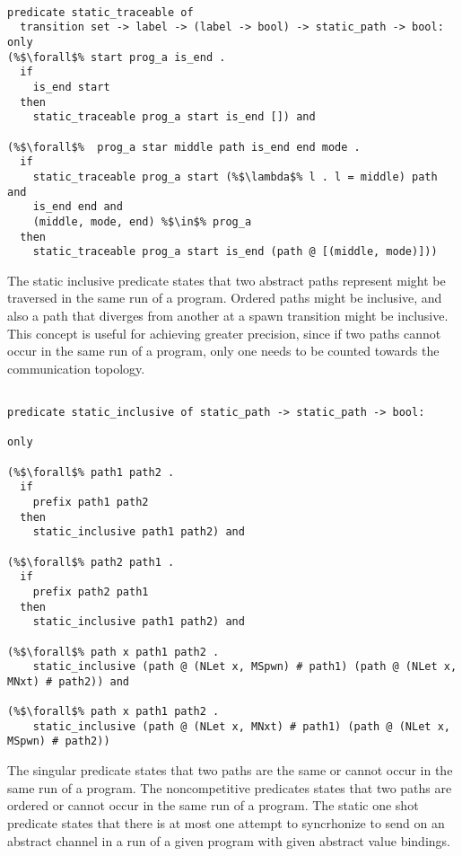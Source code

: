 \documentclass{article}
\begin{document}
\begin{lstlisting}[language=logic, style=codestyle1, escapechar=\%]

predicate static_traceable of
  transition set -> label -> (label -> bool) -> static_path -> bool:
only
(%$\forall$% start prog_a is_end .
  if
    is_end start
  then
    static_traceable prog_a start is_end []) and

(%$\forall$%  prog_a star middle path is_end end mode .
  if 
    static_traceable prog_a start (%$\lambda$% l . l = middle) path and
    is_end end and
    (middle, mode, end) %$\in$% prog_a 
  then
    static_traceable prog_a start is_end (path @ [(middle, mode)]))

\end{lstlisting}


The static inclusive predicate states that two abstract paths represent might be traversed in
the same run of a program. Ordered paths might be inclusive, and also a path that diverges
from another at a spawn transition might be inclusive.  This concept is useful for achieving
greater precision, since if two paths cannot occur in the same run of a program, only one needs
to be counted towards the communication topology. 


\begin{lstlisting}[language=logic, style=codestyle1, escapechar=\%]

predicate static_inclusive of static_path -> static_path -> bool:

only

(%$\forall$% path1 path2 .
  if
    prefix path1 path2
  then
    static_inclusive path1 path2) and

(%$\forall$% path2 path1 .
  if
    prefix path2 path1
  then
    static_inclusive path1 path2) and

(%$\forall$% path x path1 path2 .
    static_inclusive (path @ (NLet x, MSpwn) # path1) (path @ (NLet x, MNxt) # path2)) and

(%$\forall$% path x path1 path2 .
    static_inclusive (path @ (NLet x, MNxt) # path1) (path @ (NLet x, MSpwn) # path2))

\end{lstlisting}


The singular predicate states that two paths are the same or cannot occur in the same run of a
program. The noncompetitive predicates states that two paths are ordered or cannot occur in the
same run of a program. The static one shot predicate states that there is at most one attempt
to syncrhonize to send on an abstract channel in a run of a given program with given abstract
value bindings.
\end{document}
